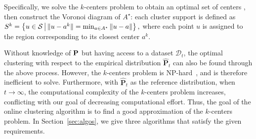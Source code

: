 Specifically, we solve the $k$-centers problem to obtain an optimal set of centers , then construct the Voronoi diagram of $A^\star$: 
each cluster support is defined as  
$ S^k =\left\{u \in \mathcal{S}\,\middle|\,\|u - a^k\| = \min_{a \in A^\star}\|u - a\| \right\},$
where each point $u$ is assigned to the region corresponding to its closest center $a^k$. 

Without knowledge of ${\mathbf P}$ but having access to a dataset $\mathcal{D}_t$, the optimal clustering with respect to the empirical distribution $\hat{\mathbf{P}}_t$ can also be found through the above process.
However, the $k$-centers problem is NP-hard~\cite{k-centers}, and is therefore inefficient to solve. 
Furthermore, with $\hat{\mathbf{P}}_t$ as the reference distribution, when $t \rightarrow \infty$, the computational complexity of the $k$-centers problem increases, conflicting with our goal of decreasing computational effort. 
Thus, the goal of the online clustering algorithm is to find a good approximation of the $k$-centers problem. In Section~\ref{sec:algos}, we give  three  algorithms that satisfy the given requirements. 


